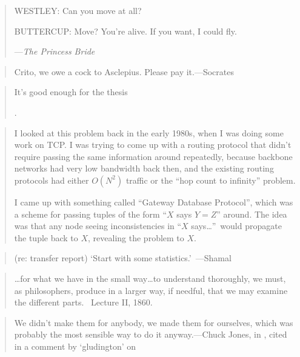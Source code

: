 \documentclass[a4paper]{article}
\begin{document}
\medskip
\begin{quote}
	WESTLEY: Can you move at all?

	BUTTERCUP: Move? You're alive. If you want, I could fly.

	---\emph{The Princess Bride}
\end{quote}

\medskip
\begin{quote}
	Crito, we owe a cock to Asclepius.  Please
	pay it.---Socrates~\cite{Plato360BC}
\end{quote}

\medskip
\begin{quote}
	It's good enough for the thesis

	\cite{Schulman1997}.
\end{quote}

\medskip
\begin{quote}
	I looked at this problem back in the early 1980s, when I was doing
	some work on TCP. I was trying to come up with a routing protocol
	that didn't require passing the same information around repeatedly,
	because backbone networks had very low bandwidth back then, and the
	existing routing protocols had either $O(N^2)$ traffic or the ``hop
	count to infinity'' problem.

	I came up with something called ``Gateway Database Protocol'', which
	was a scheme for passing tuples of the form ``$X$ says $Y=Z$''
	around. The idea was that any node seeing inconsistencies in ``$X$
	says\ldots''\ would propagate the tuple back to $X$, revealing the
	problem to $X$.~\cite{Animats2008}
\end{quote}

\medskip
\begin{quote}
	(re: transfer report) `Start with some statistics.'~---Shamal
\end{quote}

\medskip
\begin{quote}
	\ldots for what we have in the small way\ldots to
	understand thoroughly, we must, as philosophers, produce
	in a larger way, if needful, that we may examine the
	different parts.~\cite{Faraday1908} Lecture II, 1860.
\end{quote}

\medskip
\begin{quote}
	We didn't make them for anybody, we made them for ourselves,
	which was probably the most sensible way to do it
	anyway.---Chuck Jones, in \cite{Sabicer1987}, cited in a
	comment by `gludington' on \cite{Yegge2008}
\end{quote}
\end{document}
